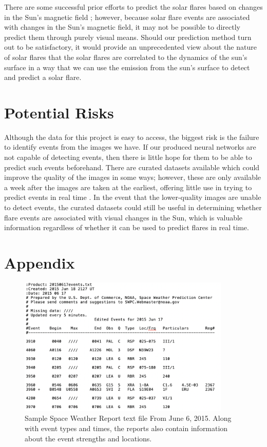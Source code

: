 \documentclass[12pt, letterpaper]{article}
\begin{document}
There are some successful prior efforts to predict the solar flares based on changes in the Sun’s magnetic field \cite{Raboonik2016}; however, because solar flare events are associated with changes in the Sun’s magnetic field, it may not be possible to directly predict them through purely visual means. Should our prediction method turn out to be satisfactory, it would provide an unprecedented view about the nature of solar flares that the solar flares are correlated to the dynamics of the sun's surface in a way that we can use the emission from the sun's surface to detect and predict a solar flare.


\section*{Potential Risks}

Although the data for this project is easy to access, the biggest risk is the failure to identify events from the images we have. If our produced neural networks are not capable of detecting events, then there is little hope for them to be able to predict such events beforehand. There are curated datasets available which could improve the quality of the images in some ways; however, these are only available a week after the images are taken at the earliest, offering little use in trying to predict events in real time \cite{Galvez2019}. In the event that the lower-quality images are unable to detect events, the curated datasets could still be useful in determining whether flare events are associated with visual changes in the Sun, which is valuable information regardless of whether it can be used to predict flares in real time.




\pagebreak
\section*{Appendix}


\begin{figure}[ht]
    \includegraphics[width=0.9\textwidth]{figures/swr_sample.png}
    \centering
    \caption{Sample Space Weather Report text file From June 6, 2015. Along with event types and times, the reports also contain information about the event strengths and locations.}
    \label{swr_sample}
\end{figure}
\end{document}
